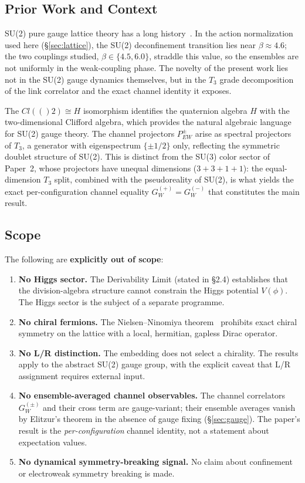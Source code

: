\documentclass[12pt,a4paper]{article}
\newcommand{\Cl}{\mathrm{Cl}}
\newcommand{\HH}{\mathbb{H}}
\newcommand{\Pew}[1]{P^{#1}_{\mathrm{EW}}}
\def\Cl#1{Cl(#1)}%
\def\HH{H}%
\def\mathbb#1{#1}%
\def\mathrm#1{#1}%
\begin{document}
\subsection{Prior Work and Context}

SU(2) pure gauge lattice theory has a long history~\cite{K1979,BC1980,L1998}.
In the action normalization used here (\S\ref{sec:lattice}), the SU(2)
deconfinement transition lies near $\beta\approx 4.6$; the two couplings studied,
$\beta\in\{4.5,6.0\}$, straddle this value, so the ensembles are not uniformly in
the weak-coupling phase.  The novelty of the present work lies not in the SU(2)
gauge dynamics themselves, but in the $T_3$ grade decomposition of the link
correlator and the exact channel identity it exposes.

The $\Cl(2)\cong\HH$ isomorphism identifies the quaternion algebra $\HH$ with the
two-dimensional Clifford algebra, which provides the natural algebraic language for
SU(2) gauge theory.  The channel projectors $\Pew{\pm}$ arise as spectral projectors
of $T_3$, a generator with eigenspectrum $\{\pm1/2\}$ only, reflecting the symmetric
doublet structure of SU(2).  This is distinct from the SU(3) color sector of
Paper~2, whose projectors have unequal dimensions ($3+3+1+1$): the equal-dimension
$T_3$ split, combined with the pseudoreality of SU(2), is what yields the exact
per-configuration channel equality $G_W^{(+)}=G_W^{(-)}$ that constitutes the main
result.
	
\subsection{Scope}

The following are \textbf{explicitly out of scope}:

\begin{enumerate}[leftmargin=*,label=\arabic*.]
	\item \textbf{No Higgs sector.}  The Derivability Limit (stated in \S2.4)
	establishes that the division-algebra structure cannot constrain the Higgs
	potential $V(\phi)$.  The Higgs sector is the subject of a separate programme.
	\item \textbf{No chiral fermions.}  The Nielsen--Ninomiya theorem~\cite{NN1,NN2}
	prohibits exact chiral symmetry on the lattice with a local, hermitian, gapless
	Dirac operator.
	\item \textbf{No L/R distinction.}  The embedding does not select a chirality.
	The results apply to the abstract SU(2) gauge group, with the explicit caveat
	that L/R assignment requires external input.
	\item \textbf{No ensemble-averaged channel observables.}  The channel
	correlators $G_W^{(\pm)}$ and their cross term are gauge-variant; their ensemble
	averages vanish by Elitzur's theorem in the absence of gauge fixing (\S\ref{sec:gauge}).
	The paper's result is the \emph{per-configuration} channel identity, not a
	statement about expectation values.
	\item \textbf{No dynamical symmetry-breaking signal.}  No claim about
	confinement or electroweak symmetry breaking is made.
\end{enumerate}
	
\end{document}
